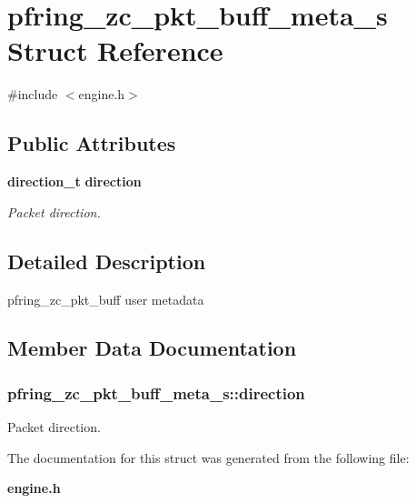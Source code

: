 \section{pfring\+\_\+zc\+\_\+pkt\+\_\+buff\+\_\+meta\+\_\+s Struct Reference}
\label{structpfring__zc__pkt__buff__meta__s}


{\ttfamily \#include $<$engine.\+h$>$}

\subsection*{Public Attributes}
\begin{DoxyCompactItemize}
\item 
{\bf direction\+\_\+t} {\bf direction}
\begin{DoxyCompactList}\small\item\em Packet direction. \end{DoxyCompactList}\end{DoxyCompactItemize}


\subsection{Detailed Description}
pfring\+\_\+zc\+\_\+pkt\+\_\+buff user metadata 

\subsection{Member Data Documentation}
\subsubsection[{direction}]{ pfring\+\_\+zc\+\_\+pkt\+\_\+buff\+\_\+meta\+\_\+s\+::direction}\label{structpfring__zc__pkt__buff__meta__s_a1ecea60e20e8ee0ff0fff4834e013a11}


Packet direction. 



The documentation for this struct was generated from the following file\+:\begin{DoxyCompactItemize}
\item 
{\bf engine.\+h}\end{DoxyCompactItemize}
